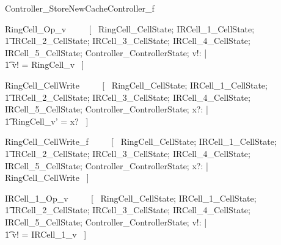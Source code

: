 \documentclass{article}
\begin{document}
\begin{zed}
Controller\_StoreNewCacheController\_f  \\
\end{zed}

\begin{zed}
RingCell\_Op\_v ~~~~ [~ 
    \Xi RingCell\_CellState; 
    \Xi IRCell\_1\_CellState; \\
    \t1 \Xi IRCell\_2\_CellState; 
    \Xi IRCell\_3\_CellState;
    \Xi IRCell\_4\_CellState; 
    \Xi IRCell\_5\_CellState; 
    \Xi Controller\_ControllerState; v!: \nat | \\
    \t1 v! = RingCell\_v ~] \\
\end{zed}

\begin{zed}
RingCell\_CellWrite ~~~~ [~ 
    \Delta RingCell\_CellState; 
    \Xi IRCell\_1\_CellState; \\
    \t1 \Xi IRCell\_2\_CellState; 
    \Xi IRCell\_3\_CellState;
    \Xi IRCell\_4\_CellState; 
    \Xi IRCell\_5\_CellState; 
    \Xi Controller\_ControllerState; 
    x?: \nat | \\
    \t1 RingCell\_v' = x? ~] \\
\end{zed}

\begin{zed}
RingCell\_CellWrite\_f ~~~~ [~ 
    \Xi RingCell\_CellState; 
    \Xi IRCell\_1\_CellState; \\
    \t1 \Xi IRCell\_2\_CellState; 
    \Xi IRCell\_3\_CellState;
    \Xi IRCell\_4\_CellState; 
    \Xi IRCell\_5\_CellState; 
    \Xi Controller\_ControllerState; 
    x?: \nat | \\
    \lnot \pre RingCell\_CellWrite ~] \\
\end{zed}

\begin{zed}
IRCell\_1\_Op\_v ~~~~ [~ 
    \Xi RingCell\_CellState; 
    \Xi IRCell\_1\_CellState; \\
    \t1 \Xi IRCell\_2\_CellState; 
    \Xi IRCell\_3\_CellState;
    \Xi IRCell\_4\_CellState; 
    \Xi IRCell\_5\_CellState; 
    \Xi Controller\_ControllerState; v!: \nat | \\
    \t1 v! = IRCell\_1\_v ~] \\
\end{zed}
\end{document}
